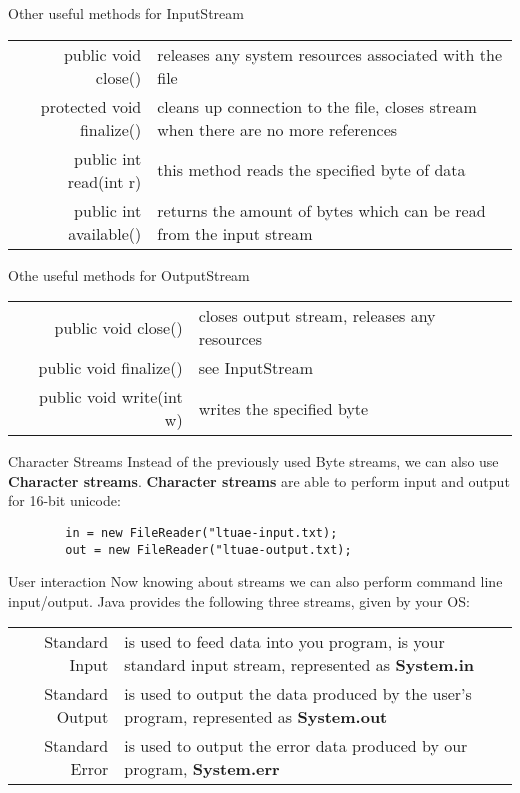 \begin{frame}{Other useful methods for InputStream}
	\begingroup
	\def\arraystretch{1.5}
	\begin{tabular}{rp{8cm}}
		public void close()&releases any system resources associated with the file\\
		protected void finalize()&cleans up connection to the file, closes stream when there are no more references\\
		public int read(int r)&this method reads the specified byte of data\\
		public int available()& returns the amount of bytes which can be read from the input stream
	\end{tabular}
	\endgroup
\end{frame}

\begin{frame}{Othe useful methods for OutputStream}
	
	\begingroup
	\def\arraystretch{1.5}
	\begin{tabular}{rp{8cm}}
		public void close()&closes output stream, releases any resources\\
		public void finalize()&see InputStream\\
		public void write(int w)&writes the specified byte
	\end{tabular}
	\endgroup
\end{frame}

\begin{frame}[fragile]{Character Streams}
	Instead of the previously used Byte streams, we can also use \textbf{Character streams}. \textbf{Character streams} are able to perform input and output for 16-bit unicode:
	
	\begin{lstlisting}
		in = new FileReader("ltuae-input.txt);
		out = new FileReader("ltuae-output.txt);
	\end{lstlisting}
\end{frame}

\begin{frame}{User interaction}
	Now knowing about streams we can also perform command line input/output. Java provides the following three streams, given by your OS:\\
	\vfill
	\begingroup
	\def\arraystretch{1.5}
	\begin{tabular}{r p{8cm}}
		Standard Input&is used to feed data into you program, is your standard input stream, represented as \textbf{System.in}\\
		Standard Output & is used to output the data produced by the user's program, represented as \textbf{System.out}\\
		Standard Error&is used to output the error data produced by our program, \textbf{System.err}
	\end{tabular}
	\endgroup
\end{frame}

